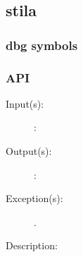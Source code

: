 %
%
%
%
%              

\subsection{stila}
\label{stila}

\subsubsection{dbg symbols}

\subsubsection{API}
\begin{description}
\label{stila_}
\item[{\cfunc[]{stila\_}{}}: ]
	\begin{description}\item[]
	\item[Input(s): ]
		\begin{description}\item[]
		\item[: ]
		\end{description}
	\item[Output(s): ]
		\begin{description}\item[]
		\item[: ]
		\end{description}
	\item[Exception(s): ]
		\begin{description}\item[]
		\item[.]
		\end{description}
	\item[Description: ]
	\end{description}
\end{description}
